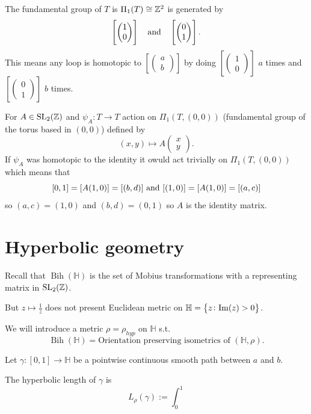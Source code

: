 \documentclass[11pt,a4paper]{article}
\DeclareMathOperator{\Bih}{Bih}
\renewcommand{\H}{\mathbb H}
\begin{document}
\begin{exercise}
  The fundamental group of $T$ is $\Pi_1(T) \cong \mathbb{Z}^2$ is generated
  by \[\left[\begin{pmatrix} 1 \\ 0 \end{pmatrix}\right] \quad \text{and} \quad
  \left[\begin{pmatrix} 0 \\ 1 \end{pmatrix}\right].\]
  This means any loop is homotopic to
  $[\begin{pmatrix} a \\ b \end{pmatrix}]$
  by doing $[\begin{pmatrix} 1 \\ 0 \end{pmatrix}]$ $a$ times
  and $[\begin{pmatrix} 0 \\ 1 \end{pmatrix}]$ $b$ times.
\end{exercise}

For $A \in \mathrm{SL}_2(\mathbb{Z})$ and $\psi_A \colon T \to T$ action on
$\Pi_1(T, (0,0))$ (fundamental group of the torus based in $(0,0)$)
defined by
\[
  (x,y) \mapsto A \begin{pmatrix} x \\ y \end{pmatrix}.
\]
If $\psi_A$ was homotopic to the identity it owuld act trivially on
$\Pi_1(T, (0,0))$ which means that
\[
  [0,1] = [A (1,0)] = [(b,d)] \text{ and } [(1,0)] = [A(1,0)] = [(a,c)]
\]
so $(a,c) = (1,0)$ and $(b,d) = (0,1)$ so $A$ is the identity matrix.

\newpage

\section{Hyperbolic geometry}
Recall that $\Bih(\H)$ is the set of Mobius transformations with a representing
matrix in $\mathrm{SL}_2(\mathbb{Z})$.

But $z \mapsto \frac 1z$ does not present Euclidean metric on 
$\H = \set{z \colon \Im(z) > 0}$.

We will introduce a metric $\rho = \rho_{hyp}$ on $\H$ s.t.\
\[
  \Bih(\H) = \text{Orientation preserving isometrics of } (\H,\rho).
\]

\begin{definition}[Length]
  Let $\gamma \colon [0,1] \to \H$ be a pointwise continuous smooth path
  between $a$ and $b$.

  The hyperbolic length of $\gamma$ is
  \[
    L_{\rho}(\gamma) :=
    \int_0^1 
  \]
\end{definition}
\end{document}
